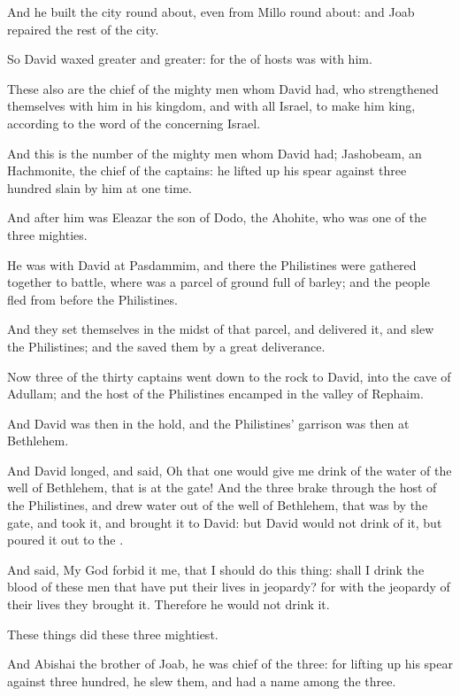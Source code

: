 \Verse And he built the city round about, even from Millo round about: and Joab repaired the rest of the city.

\Verse So David waxed greater and greater: for the \LORD of hosts was with him.

\Verse These also are the chief of the mighty men whom David had, who strengthened themselves with him in his kingdom, and with all Israel, to make him king, according to the word of the \LORD concerning Israel.

\Verse And this is the number of the mighty men whom David had; Jashobeam, an Hachmonite, the chief of the captains: he lifted up his spear against three hundred slain by him at one time.

\Verse And after him was Eleazar the son of Dodo, the Ahohite, who was one of the three mighties.

\Verse He was with David at Pasdammim, and there the Philistines were gathered together to battle, where was a parcel of ground full of barley; and the people fled from before the Philistines.

\Verse And they set themselves in the midst of that parcel, and delivered it, and slew the Philistines; and the \LORD saved them by a great deliverance.

\Verse Now three of the thirty captains went down to the rock to David, into the cave of Adullam; and the host of the Philistines encamped in the valley of Rephaim.

\Verse And David was then in the hold, and the Philistines' garrison was then at Bethlehem.

\Verse And David longed, and said, Oh that one would give me drink of the water of the well of Bethlehem, that is at the gate!  \Verse And the three brake through the host of the Philistines, and drew water out of the well of Bethlehem, that was by the gate, and took it, and brought it to David: but David would not drink of it, but poured it out to the \LORD.

\Verse And said, My God forbid it me, that I should do this thing: shall I drink the blood of these men that have put their lives in jeopardy? for with the jeopardy of their lives they brought it.  Therefore he would not drink it.

These things did these three mightiest.

\Verse And Abishai the brother of Joab, he was chief of the three: for lifting up his spear against three hundred, he slew them, and had a name among the three.

